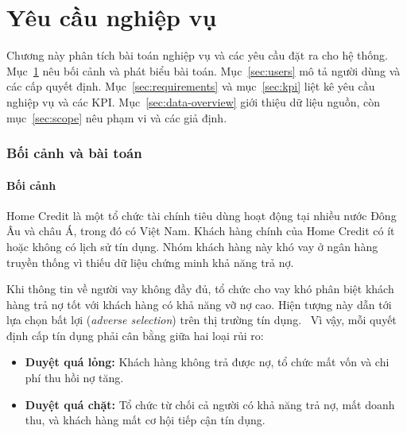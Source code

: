 \setcounter{page}{1}
\fancyfoot[C]{} %
\part{Yêu cầu nghiệp vụ}
\label{part:ch1}

Chương này phân tích bài toán nghiệp vụ và các yêu cầu đặt ra cho hệ thống. Mục~\ref{sec:ch1-context} nêu bối cảnh và phát biểu bài toán. Mục~\ref{sec:users} mô tả người dùng và các cấp quyết định. Mục~\ref{sec:requirements} và mục~\ref{sec:kpi} liệt kê yêu cầu nghiệp vụ và các KPI. Mục~\ref{sec:data-overview} giới thiệu dữ liệu nguồn, còn mục~\ref{sec:scope} nêu phạm vi và các giả định.

\section{Bối cảnh và bài toán}
\label{sec:ch1-context}

\subsection{Bối cảnh}
\label{sec:context}
Home Credit là một tổ chức tài chính tiêu dùng hoạt động tại nhiều nước Đông Âu và châu Á, trong đó có Việt Nam. Khách hàng chính của Home Credit có ít hoặc không có lịch sử tín dụng. Nhóm khách hàng này khó vay ở ngân hàng truyền thống vì thiếu dữ liệu chứng minh khả năng trả nợ.~\cite{homecredit2018}

\medskip

Khi thông tin về người vay không đầy đủ, tổ chức cho vay khó phân biệt khách hàng trả nợ tốt với khách hàng có khả năng vỡ nợ cao. Hiện tượng này dẫn tới lựa chọn bất lợi (\textit{adverse selection}) trên thị trường tín dụng.~\cite{stiglitz1981credit} Vì vậy, mỗi quyết định cấp tín dụng phải cân bằng giữa hai loại rủi ro:
\begin{itemize}[topsep=0pt, itemsep=1pt]
	\item \textbf{Duyệt quá lỏng:} Khách hàng không trả được nợ, tổ chức mất vốn và chi phí thu hồi nợ tăng.
	\item \textbf{Duyệt quá chặt:} Tổ chức từ chối cả người có khả năng trả nợ, mất doanh thu, và khách hàng mất cơ hội tiếp cận tín dụng.
\end{itemize}

